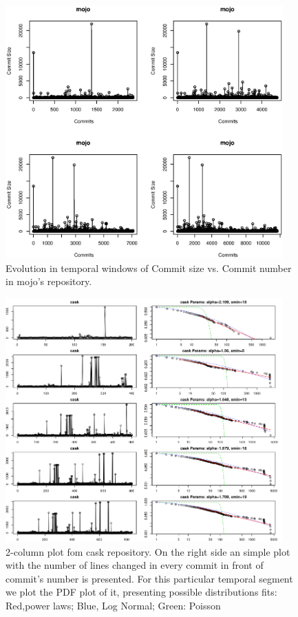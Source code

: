 \documentclass[conference]{IEEEtran}
\begin{document}
\begin{figure}[htbp]
	\centerline{\includegraphics[width=0.95\textwidth]{img/mojo_temporal.eps}}
	\caption{Evolution in temporal windows of Commit size vs. Commit number in mojo's repository.}
	\label{fig:cask}
      \end{figure}

\begin{figure}[htbp]
	\centerline{\includegraphics[width=0.95\textwidth]{img/adjusted_dist_cask.png}}
	\caption{2-column plot fom cask repository. On the right side an simple plot with the number of lines changed in every commit in front of commit's number is presented. For this particular temporal segment we plot the PDF plot of it, presenting possible distributions fits: Red,power laws; Blue, Log Normal; Green: Poisson}
	\label{fig:cask}
      \end{figure}
\end{document}
